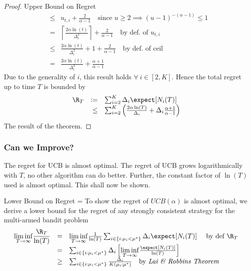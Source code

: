 \documentclass[11pt,a4paper]{article}
\begin{document}
\begin{proof}{Upper Bound on Regret}
\[\begin{array}{rcl}
    &\leq& u_{t,i}+\frac{2}{\alpha-1}\quad\text{since }u\geq2\implies (u-1)^{-(\alpha-1)}\leq 1\\
    &=&\left\lceil\frac{2\alpha\ln(t)}{\Delta_i^2}\right\rceil+\frac2{\alpha-1}\quad\text{by def. of }u_{t,i}\\
    &\leq&\frac{2\alpha\ln(t)}{\Delta_i^2}+1+\frac2{\alpha-1}\quad\text{by def. of ceil}\\
    &=&\frac{2\alpha\ln(t)}{\Delta_i^2}+\frac{\alpha+1}{\alpha-1}
    \end{array}\]
    Due to the generality of $i$, this result holds $\forall\ i\in[2,K]$. Hence the total regret up to time $T$ is bounded by
    \[\begin{array}{rrl}
      \R_T&:=&\sum_{i=2}^K\Delta_i\expect[N_i(T)]\\
      &\leq&\sum_{i=2}^K\left(\frac{2\alpha\ln(T)}{\Delta_i}+\Delta_i\frac{\alpha+1}{\alpha-1}\right)
    \end{array}\]
    The result of the theorem.
    \proved
  \end{proof}

\subsubsection{Can we Improve?}

  \begin{remark}{The regret for UCB is almost optimal.}
    The regret of UCB grows logarithmically with $T$, no other algorithm can do better. Further, the constant factor of $\ln(T)$ used is almost optimal. This shall now be shown.
  \end{remark}

  \begin{proposition}{Lower Bound on Regret}
    \everymath={\displaystyle}
    To show the regret of $UCB(\alpha)$ is almost optimal, we derive a lower bound for the regret of any strongly consistent strategy for the multi-armed bandit problem
    \[\begin{array}{rcl}
      \underset{T\to\infty}{\lim\inf}\dfrac{\R_T}{\ln(T)}&=&\underset{T\to\infty}{\lim\inf}\frac1{\ln(T)}\sum_{i\in\{i:\mu_i<\mu^*\}}\Delta_i\expect[N_i(T)]\quad\text{ by def }\R_T\\
      &=&\sum_{i\in\{i:\mu_i<\mu^*\}}\Delta_i\left[\underset{T\to\infty}{\lim\inf}\frac{\expect[N_i(T)]}{\ln(T)}\right]\\
      &\geq&\sum_{i\in\{i:\mu_i<\mu^*\}}\frac{\Delta_i}{K(\mu_i;\mu^*)}\quad\text{by \textit{Lai \& Robbins Theorem}}
    \end{array}\]
  \end{proposition}
\end{document}
